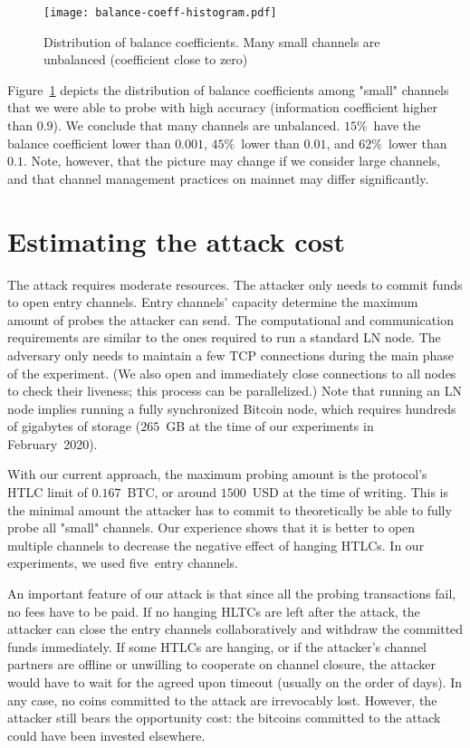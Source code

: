 \begin{figure}[h]
	\centering
	\texttt{[image: balance-coeff-histogram.pdf]}
	\caption{Distribution of balance coefficients. Many small channels are unbalanced (coefficient close to zero)}
	\label{fig:balance-coeff-histogram}
\end{figure}

Figure~\ref{fig:balance-coeff-histogram} depicts the distribution of balance coefficients among "small" channels that we were able to probe with high accuracy (information coefficient higher than $0.9$).
We conclude that many channels are unbalanced.
$15$\%~have the balance coefficient lower than $0.001$, $45\%$~lower than $0.01$, and $62\%$~lower than $0.1$.
Note, however, that the picture may change if we consider large channels, and that channel management practices on mainnet may differ significantly.


\section{Estimating the attack cost}

The attack requires moderate resources.
The attacker only needs to commit funds to open entry channels.
Entry channels' capacity determine the maximum amount of probes the attacker can send.
The computational and communication requirements are similar to the ones required to run a standard LN node.
The adversary only needs to maintain a few TCP connections during the main phase of the experiment.
(We also open and immediately close connections to all nodes to check their liveness; this process can be parallelized.)
Note that running an LN node implies running a fully synchronized Bitcoin node, which requires hundreds of gigabytes of storage ($265$~GB at the time of our experiments in February~2020).

With our current approach, the maximum probing amount is the protocol's HTLC limit of $0.167$~BTC, or around $1500$~USD at the time of writing.
This is the minimal amount the attacker has to commit to theoretically be able to fully probe all "small" channels.
Our experience shows that it is better to open multiple channels to decrease the negative effect of hanging HTLCs.
In our experiments, we used five~entry channels.

An important feature of our attack is that since all the probing transactions fail, no fees have to be paid.
If no hanging HLTCs are left after the attack, the attacker can close the entry channels collaboratively and withdraw the committed funds immediately.
If some HTLCs are hanging, or if the attacker's channel partners are offline or unwilling to cooperate on channel closure, the attacker would have to wait for the agreed upon timeout (usually on the order of days).
In any case, no coins committed to the attack are irrevocably lost.
However, the attacker still bears the opportunity cost: the bitcoins committed to the attack could have been invested elsewhere.


